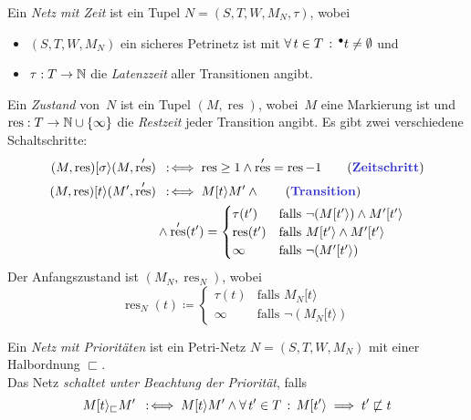 \documentclass{cheat-sheet}
\newcommand{\preset}[1]{{}^\bullet{#1}} %
\newcommand{\activeTransition}[1]{[{#1}\rangle} %
\DeclareMathOperator{\resTime}{res} %
\begin{document}

\begin{defn}
  Ein \emph{Netz mit Zeit} ist ein Tupel $N = (S, T, W, M_N, \tau)$, wobei
  \begin{itemize}
    \item $(S, T, W, M_N)$ ein sicheres Petrinetz ist mit $\fa{t \in T} \preset{t} \neq \emptyset$ und
    \item $\tau : T \to \mathbb{N}$ die \emph{Latenzzeit} aller Transitionen angibt.
  \end{itemize}
  Ein \emph{Zustand} von~$N$ ist ein Tupel $(M, \resTime)$, wobei~$M$ eine Markierung ist und $\resTime : T \to \N \cup \{ \infty \}$ die \textit{Restzeit} jeder Transition angibt.
  Es gibt zwei verschiedene Schaltschritte:
  \begin{align*}
    (M, \resTime) \activeTransition{\sigma} (M, \resTime') & \coloniff
    \resTime \geq 1 \wedge \resTime' = \resTime - 1 \tag{\emph{Zeitschritt}} \\
    (M, \resTime) \activeTransition{t} (M', \resTime') & \coloniff
    M \activeTransition{t} M' \wedge \tag{\emph{Transition}} \\
    & \wedge \resTime'(t') = \begin{cases}
      \tau(t') & \text{falls $\neg (M \activeTransition{t'}) \wedge M' \activeTransition{t'}$} \\
      \resTime(t') & \text{falls $M \activeTransition{t'} \wedge M' \activeTransition{t'}$} \\
      \infty & \text{falls $\neg (M' \activeTransition{t'})$}
    \end{cases}
  \end{align*}
  Der Anfangszustand ist $(M_N, \resTime_N)$, wobei
  \[
    \resTime_N(t) \coloneqq \begin{cases}
      \tau(t) & \text{falls } M_N \activeTransition{t} \\
      \infty & \text{falls } \neg (M_N \activeTransition{t})
    \end{cases}
  \]
\end{defn}


\begin{defn}
  Ein \emph{Netz mit Prioritäten} ist ein Petri-Netz $N = (S, T, W, M_N)$ mit einer Halbordnung ${\sqsubset}$. \\
  Das Netz \textit{schaltet unter Beachtung der Priorität}, falls
  \[
    M \activeTransition{t}_{\sqsubset} M' \coloniff M \activeTransition{t} M' \wedge \fa{t' \in T} M \activeTransition{t'} \implies t' \not\sqsubset t
  \]
\end{defn}
\end{document}
